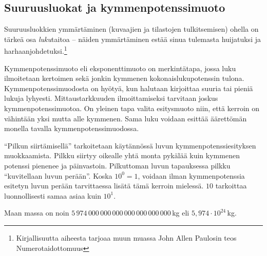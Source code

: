 \subsection*{Suuruusluokat ja kymmenpotenssimuoto}

Suuruusluokkien ymmärtäminen (kuvaajien ja tilastojen tulkitsemisen) ohella on tärkeä osa \textit{luku}taitoa – näiden ymmärtäminen estää sinua tulemasta huijatuksi ja harhaanjohdetuksi.\footnote[1]{Kirjallisuutta aiheesta tarjoaa muun muassa John Allen Paulosin teos Numerotaidottomuus}

Kymmenpotenssimuoto eli eksponenttimuoto on merkintätapa, jossa luku ilmoitetaan kertoimen sekä jonkin kymmenen kokonaislukupotenssin tulona. Kymmenpotenssimuodosta on hyötyä, kun halutaan kirjoittaa suuria tai pieniä lukuja lyhyesti. Mittaustarkkuuden ilmoittamiseksi tarvitaan joskus kymmenpotenssimuotoa. On yleinen tapa valita esitysmuoto niin, että kerroin on vähintään yksi mutta alle kymmenen. Sama luku voidaan esittää äärettömän monella tavalla kymmenpotenssimuodossa. 

``Pilkun siirtämisellä'' tarkoitetaan käytännössä luvun kymmenpotenssiesityksen muokkaamista. Pilkku siirtyy oikealle yhtä monta pykälää kuin kymmenen potenssi pienenee ja päinvastoin. Pilkuttoman luvun tapauksessa pilkku ``kuvitellaan luvun perään''. Koska $10^0 = 1$, voidaan ilman kymmenpotenssia esitetyn luvun perään tarvittaessa lisätä tämä kerroin mielessä. $10$ tarkoittaa luonnollisesti samaa asiaa kuin $10^1$. 

\begin{esimerkki}
Maan massa on noin $5\,974\,000\,000\,000\,000\,000\,000\,000$\,kg  eli $5,974\cdot10^{24}$\,kg.
\end{esimerkki}

